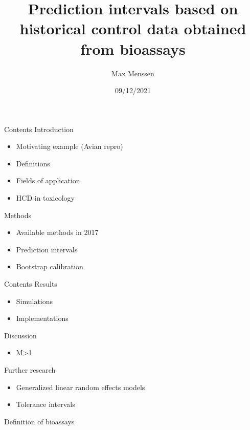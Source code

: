 \documentclass[
  ignorenonframetext,
]{beamer}
\title{Prediction intervals based on historical control data obtained
from bioassays}
\author{Max Menssen}
\date{09/12/2021}
\providecommand{\tightlist}{%
  \setlength{\itemsep}{0pt}\setlength{\parskip}{0pt}}
\begin{document}
\frame{\titlepage}

\begin{frame}{Contents}
\protect\hypertarget{contents}{}
Introduction

\begin{itemize}
\tightlist
\item
  Motivating example (Avian repro)
\item
  Definitions
\item
  Fields of application
\item
  HCD in toxicology
\end{itemize}

Methods

\begin{itemize}
\tightlist
\item
  Available methods in 2017
\item
  Prediction intervals
\item
  Bootstrap calibration
\end{itemize}
\end{frame}

\begin{frame}{Contents}
\protect\hypertarget{contents-1}{}
Results

\begin{itemize}
\tightlist
\item
  Simulations
\item
  Implementations
\end{itemize}

Discussion

\begin{itemize}
\tightlist
\item
  M\textgreater1
\end{itemize}

Further research

\begin{itemize}
\tightlist
\item
  Generalized linear random effects models
\item
  Tolerance intervals
\end{itemize}
\end{frame}

\begin{frame}{}
\protect\hypertarget{section}{}
\end{frame}

\begin{frame}{Definition of bioassays}
\protect\hypertarget{definition-of-bioassays}{}
\end{frame}
\end{document}

